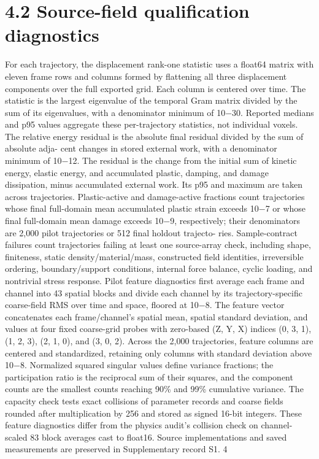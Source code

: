 \documentclass[11pt]{article}
\begin{document}
\section*{4.2 Source-field qualification diagnostics}

For each trajectory, the displacement rank-one statistic uses a float64 matrix with eleven frame rows
and columns formed by flattening all three displacement components over the full exported grid.
Each column is centered over time. The statistic is the largest eigenvalue of the temporal Gram
matrix divided by the sum of its eigenvalues, with a denominator minimum of 10\ensuremath{-}30. Reported
medians and p95 values aggregate these per-trajectory statistics, not individual voxels.
The relative energy residual is the absolute final residual divided by the sum of absolute adja-
cent changes in stored external work, with a denominator minimum of 10\ensuremath{-}12. The residual is the
change from the initial sum of kinetic energy, elastic energy, and accumulated plastic, damping,
and damage dissipation, minus accumulated external work. Its p95 and maximum are taken across
trajectories. Plastic-active and damage-active fractions count trajectories whose final full-domain
mean accumulated plastic strain exceeds 10\ensuremath{-}7 or whose final full-domain mean damage exceeds
10\ensuremath{-}9, respectively; their denominators are 2,000 pilot trajectories or 512 final holdout trajecto-
ries. Sample-contract failures count trajectories failing at least one source-array check, including
shape, finiteness, static density/material/mass, constructed field identities, irreversible ordering,
boundary/support conditions, internal force balance, cyclic loading, and nontrivial stress response.
Pilot feature diagnostics first average each frame and channel into 43 spatial blocks and divide
each channel by its trajectory-specific coarse-field RMS over time and space, floored at 10\ensuremath{-}8. The
feature vector concatenates each frame/channel’s spatial mean, spatial standard deviation, and
values at four fixed coarse-grid probes with zero-based (Z, Y, X) indices (0, 3, 1), (1, 2, 3), (2, 1, 0),
and (3, 0, 2). Across the 2,000 trajectories, feature columns are centered and standardized, retaining
only columns with standard deviation above 10\ensuremath{-}8. Normalized squared singular values define
variance fractions; the participation ratio is the reciprocal sum of their squares, and the component
counts are the smallest counts reaching 90\% and 99\% cumulative variance. The capacity check
tests exact collisions of parameter records and coarse fields rounded after multiplication by 256
and stored as signed 16-bit integers. These feature diagnostics differ from the physics audit’s
collision check on channel-scaled 83 block averages cast to float16. Source implementations and
saved measurements are preserved in Supplementary record S1.
4
\end{document}
